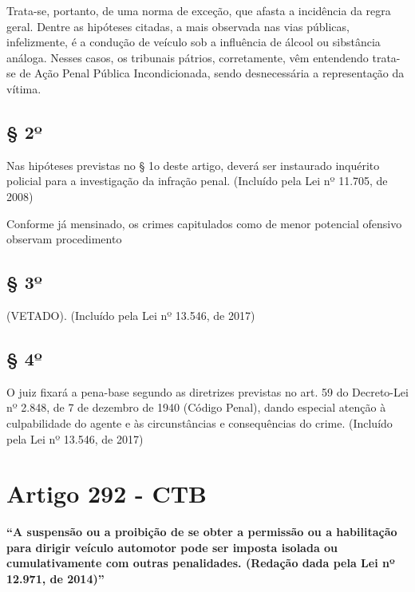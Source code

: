 \documentclass[
  letterpaper,
  DIV=11,
  numbers=noendperiod]{scrreport}
\begin{document}
Trata-se, portanto, de uma norma de exceção, que afasta a incidência da
regra geral. Dentre as hipóteses citadas, a mais observada nas vias
públicas, infelizmente, é a condução de veículo sob a influência de
álcool ou sibstância análoga. Nesses casos, os tribunais pátrios,
corretamente, vêm entendendo trata-se de Ação Penal Pública
Incondicionada, sendo desnecessária a representação da vítima.

\hypertarget{uxba-1}{%
\subsection{\texorpdfstring{\textbf{§ 2º}}{§ 2º}}\label{uxba-1}}

Nas hipóteses previstas no § 1o deste artigo, deverá ser instaurado
inquérito policial para a investigação da infração penal. (Incluído pela
Lei nº 11.705, de 2008)

Conforme já mensinado, os crimes capitulados como de menor potencial
ofensivo observam procedimento

\hypertarget{uxba-2}{%
\subsection{\texorpdfstring{\textbf{§ 3º}}{§ 3º}}\label{uxba-2}}

(VETADO). (Incluído pela Lei nº 13.546, de 2017)

\hypertarget{uxba-3}{%
\subsection{\texorpdfstring{\textbf{§ 4º}}{§ 4º}}\label{uxba-3}}

O juiz fixará a pena-base segundo as diretrizes previstas no art. 59 do
Decreto-Lei nº 2.848, de 7 de dezembro de 1940 (Código Penal), dando
especial atenção à culpabilidade do agente e às circunstâncias e
consequências do crime. (Incluído pela Lei nº 13.546, de 2017)

\hypertarget{artigo-292---ctb}{%
\section{\texorpdfstring{\textbf{Artigo 292 -
CTB}}{Artigo 292 - CTB}}\label{artigo-292---ctb}}

\begin{tcolorbox}[enhanced jigsaw, titlerule=0mm, colframe=quarto-callout-important-color-frame, opacityback=0, breakable, colbacktitle=quarto-callout-important-color!10!white, left=2mm, bottomtitle=1mm, toprule=.15mm, rightrule=.15mm, arc=.35mm, leftrule=.75mm, bottomrule=.15mm, opacitybacktitle=0.6, toptitle=1mm, title=\textcolor{quarto-callout-important-color}{\faExclamation}\hspace{0.5em}{Important}, colback=white, coltitle=black]

\textbf{``A suspensão ou a proibição de se obter a permissão ou a
habilitação para dirigir veículo automotor pode ser imposta isolada ou
cumulativamente com outras penalidades. (Redação dada pela Lei nº
12.971, de 2014)''}

\end{tcolorbox}
\end{document}
